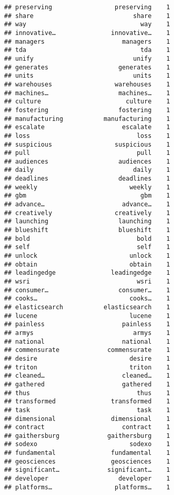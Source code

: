 \documentclass[]{article}
\begin{document}
\begin{verbatim}
## preserving                 preserving    1
## share                           share    1
## way                               way    1
## innovative…               innovative…    1
## managers                     managers    1
## tda                               tda    1
## unify                           unify    1
## generates                   generates    1
## units                           units    1
## warehouses                 warehouses    1
## machines…                   machines…    1
## culture                       culture    1
## fostering                   fostering    1
## manufacturing           manufacturing    1
## escalate                     escalate    1
## loss                             loss    1
## suspicious                 suspicious    1
## pull                             pull    1
## audiences                   audiences    1
## daily                           daily    1
## deadlines                   deadlines    1
## weekly                         weekly    1
## gbm                               gbm    1
## advance…                     advance…    1
## creatively                 creatively    1
## launching                   launching    1
## blueshift                   blueshift    1
## bold                             bold    1
## self                             self    1
## unlock                         unlock    1
## obtain                         obtain    1
## leadingedge               leadingedge    1
## wsri                             wsri    1
## consumer…                   consumer…    1
## cooks…                         cooks…    1
## elasticsearch           elasticsearch    1
## lucene                         lucene    1
## painless                     painless    1
## armys                           armys    1
## national                     national    1
## commensurate             commensurate    1
## desire                         desire    1
## triton                         triton    1
## cleaned…                     cleaned…    1
## gathered                     gathered    1
## thus                             thus    1
## transformed               transformed    1
## task                             task    1
## dimensional               dimensional    1
## contract                     contract    1
## gaithersburg             gaithersburg    1
## sodexo                         sodexo    1
## fundamental               fundamental    1
## geosciences               geosciences    1
## significant…             significant…    1
## developer                   developer    1
## platforms…                 platforms…    1

\end{verbatim}
\end{document}
